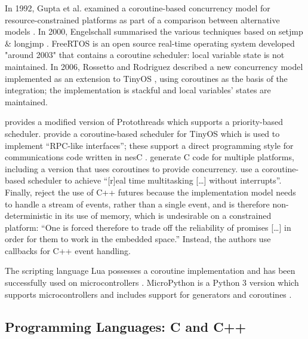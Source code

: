 \documentclass[format=acmsmall, review=false, screen=false]{acmart}
\begin{document}
In 1992, Gupta et al. examined a coroutine-based concurrency model for resource-constrained platforms as part of a comparison between alternative models \cite{Gupta1992}. In 2000, Engelschall summarised the various techniques based on setjmp \& longjmp \cite{Engelschall2000}. FreeRTOS \cite{Barry2018} is an open source real-time operating system developed "around 2003" that contains a coroutine scheduler: local variable state is not maintained. In 2006, Rossetto and Rodriguez described a new concurrency model \cite{Rossetto2006} implemented as an extension to TinyOS \cite{Levis2005}, using coroutines as the basis of the integration; the implementation is stackful and local variables’ states are maintained. 


 provides a modified version of Protothreads which supports a priority-based scheduler.  provide a coroutine-based scheduler for TinyOS \cite{Levis2005} which is used to implement “RPC-like interfaces”; these support a direct programming style for communications code written in nesC \cite{Gay2003}.  generate C code for multiple platforms, including a version that uses coroutines to provide concurrency.  use a coroutine-based scheduler to achieve “[r]eal time multitasking […] without interrupts”. Finally,  reject the use of C++ futures because the implementation model needs to handle a stream of events, rather than a single event, and is therefore non-deterministic in its use of memory, which is undesirable on a constrained platform: “One is forced therefore to trade off the reliability of promises […] in order for them to work in the embedded space.” Instead, the authors use callbacks for C++ event handling.

The scripting language Lua possesses a coroutine implementation \cite{Moura2004a} and has been successfully used on microcontrollers \cite{Hempel2008}. MicroPython \cite{George2014a} is a Python 3 version which supports microcontrollers \cite{George2014b} and includes support for generators and coroutines \cite{VanRossum2005, Python2017}.

\subsection{Programming Languages: C and C++}
\end{document}

